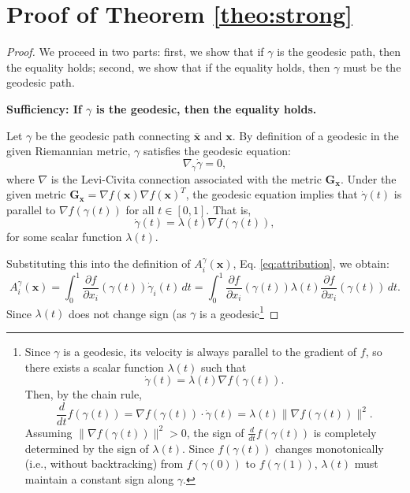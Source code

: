 \section{Proof of Theorem \ref{theo:strong}}
\label{app:proof}

\begin{proof}
	\label{proof:strong}
	We proceed in two parts: first, we show that if \( \gamma \) is the geodesic path, then the equality holds; second, we show that if the equality holds, then \( \gamma \) must be the geodesic path.
	
	\noindent
	
	\textbf{Sufficiency: If \( \gamma \) is the geodesic, then the equality holds.}
	
	Let \( \gamma \) be the geodesic path connecting \( \overline{\mathbf{x}} \) and \( \mathbf{x} \). By definition of a geodesic in the given Riemannian metric, \( \gamma \) satisfies the geodesic equation:
	\[
	\nabla_{\dot{\gamma}} \dot{\gamma} = 0,
	\]
	where \( \nabla \) is the Levi-Civita connection associated with the metric \( \mathbf{G}_{\mathbf{x}} \). Under the given metric \( \mathbf{G}_{\mathbf{x}} = \nabla f(\mathbf{x}) \nabla f(\mathbf{x})^T \), the geodesic equation implies that \( \dot{\gamma}(t) \) is parallel to \( \nabla f(\gamma(t)) \) for all \( t \in [0,1] \). That is,
	\[
	\dot{\gamma}(t) = \lambda(t) \nabla f(\gamma(t)),
	\]
	for some scalar function \( \lambda(t) \).
	
	Substituting this into the definition of \( A_i^{\gamma}(\mathbf{x}) \), Eq. \ref{eq:attribution}, we obtain:
	\[
	A_i^{\gamma}(\mathbf{x}) = \int_0^1 \frac{\partial f}{\partial x_i}(\gamma(t)) \dot{\gamma}_i(t) \, dt = \int_0^1 \frac{\partial f}{\partial x_i}(\gamma(t)) \lambda(t) \frac{\partial f}{\partial x_i}(\gamma(t)) \, dt.
	\]
	Since \( \lambda(t) \) does not change sign (as \( \gamma \) is a geodesic\footnote{Since $\gamma$ is a geodesic, its velocity is always parallel to the gradient of $f$, so there exists a scalar function $\lambda(t)$ such that
		\[
		\dot{\gamma}(t) = \lambda(t)\nabla f(\gamma(t)).
		\]
		Then, by the chain rule,
		\[
		\frac{d}{dt} f(\gamma(t)) = \nabla f(\gamma(t))\cdot\dot{\gamma}(t)= \lambda(t)\|\nabla f(\gamma(t))\|^2.
		\]
		Assuming $\|\nabla f(\gamma(t))\|^2>0$, the sign of $\frac{d}{dt} f(\gamma(t))$ is completely determined by the sign of $\lambda(t)$. Since $f(\gamma(t))$ changes monotonically (i.e., without backtracking) from $f(\gamma(0))$ to $f(\gamma(1))$, $\lambda(t)$ must maintain a constant sign along $\gamma$. 
		
}
\end{proof}
